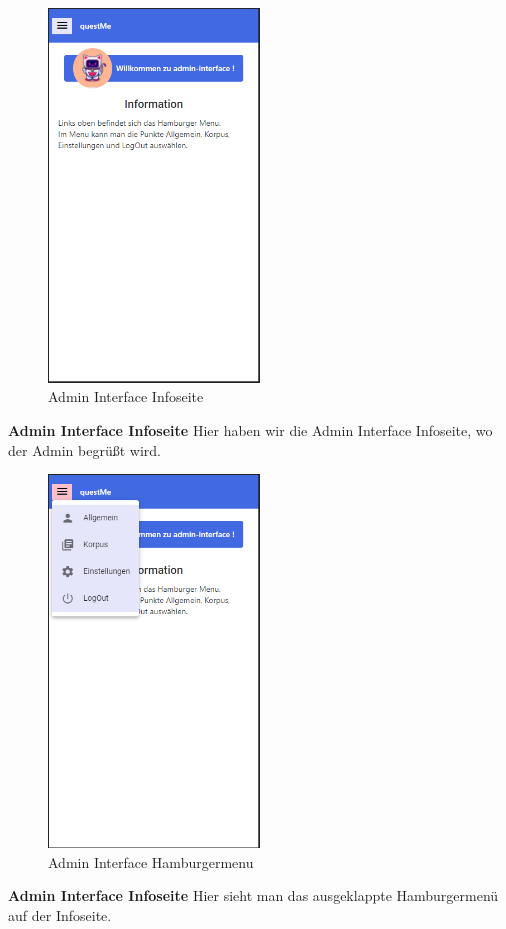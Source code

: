 \begin{figure}[H]
    \centering
    \includegraphics[width=0.5\textwidth]{bilder/prototyp UI Design/admininteface.png}
    \caption{Admin Interface Infoseite}
    \label{fig:Admin Interface Infoseite}
\end{figure}
\noindent \textbf{Admin Interface Infoseite} \newline
Hier haben wir die Admin Interface Infoseite, wo der Admin begrüßt wird.

\begin{figure}[H]
    \centering
    \includegraphics[width=0.5\textwidth]{bilder/prototyp UI Design/hamburgermenu_admininterface.png}
    \caption{Admin Interface Hamburgermenu}
    \label{fig:Admin Interface Hamburgermenu}
\end{figure}
\noindent \textbf{Admin Interface Infoseite} \newline
Hier sieht man das ausgeklappte Hamburgermenü auf der Infoseite.


